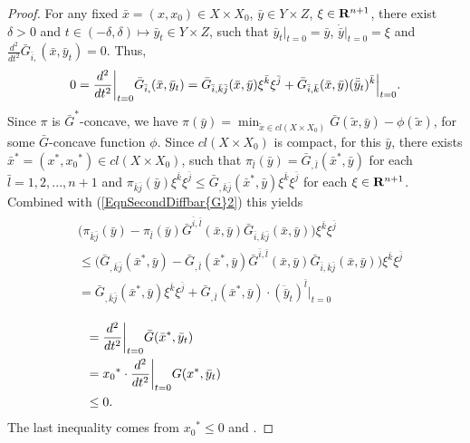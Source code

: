 \begin{proof}
		For any fixed $\bar{x} = (x, x_0) \in X \times X_0$, $\bar{y} \in Y\times Z$, $\xi \in {\mathbf R}^{n+1}$, there exist $\delta >0$ and $t \in (-\delta, \delta) \longmapsto \bar{y}_t \in Y\times Z$, such that $\bar{y}_t|_{t=0} =\bar{y}$,  $\dot{\bar{y}}|_{t=0} = \xi$ and $\frac{d^2}{dt^2} \bar{G}_{\bar{i}, }(\bar{x}, \bar{y}_t) = 0$. Thus, 
		\begin{equation}\label{EqnSecondDiffbar{G}2}
		0 = \frac{d^2}{dt^2}\bigg|_{t=0}\bar{G}_{\bar{i},}(\bar{x}, \bar{y}_t) = \bar{G}_{\bar{i}, \bar{k}\bar{j}}(\bar{x}, \bar{y}) \xi^{\bar{k}}\xi^{\bar{j}} + \bar{G}_{\bar{i}, \bar{k}}(\bar{x}, \bar{y}) (\ddot{\bar{y}}_t)^{\bar{k}}\Big|_{t=0}.
		\end{equation}
		Since $\pi$ is $\bar{G}^*$-concave, we have $\pi(\bar{y}) =\min_{\tilde{x} \in cl(X \times X_0)} \bar{G}(\tilde{x}, \bar{y}) - \phi(\tilde{x})$, for some $\bar{G}$-concave function $\phi$. Since $cl(X \times X_0)$ is compact, for this $\bar{y}$, there exists ${\bar{x}}^* = ({x}^*, {x_0}^*) \in cl(X \times X_0)$, such that 
		$\pi_{\bar{l}}(\bar{y}) = \bar{G}_{,\bar{l}}({\bar{x}}^*, \bar{y})$ for each $\bar{l} = 1, 2,..., n+1$ and $\pi_{\bar{k}\bar{j}}(\bar{y})\xi^{\bar{k}}\xi^{\bar{j}} \le \bar{G}_{,\bar{k}\bar{j}}({\bar{x}^*}, \bar{y})\xi^{\bar{k}}\xi^{\bar{j}}$  for each $\xi \in {\mathbf R}^{n+1}$. 
		Combined with (\ref{EqnSecondDiffbar{G}2}) this yields
		\begin{align*}\label{Eqn:proofcor}
		\begin{split}
		&\big(\pi_{\bar{k}\bar{j}}(\bar{y})- \pi_{\bar{l}}(\bar{y}) \bar{G}^{\bar i,\bar l}(\bar{x}, \bar{y})\bar{G}_{\bar{i},\bar{k}\bar{j}}(\bar{x}, \bar{y})\big)\xi^{\bar{k}}\xi^{\bar{j}} \\
		&\le
		\big(\bar{G}_{,\bar{k}\bar{j}}({\bar{x}}^*, \bar{y})- \bar{G}_{,\bar{l}}({\bar{x}}^*, \bar{y})\bar{G}^{\bar i,\bar l}(\bar{x}, \bar{y})\bar{G}_{\bar{i},\bar{k}\bar{j}}(\bar{x}, \bar{y})\big)\xi^{\bar{k}}\xi^{\bar{j}} \\
		&= \bar{G}_{,\bar{k}\bar{j}}({\bar{x}}^*, \bar{y})\xi^{\bar{k}}\xi^{\bar{j}}+ \bar{G}_{,\bar{l}}({\bar{x}}^*, \bar{y})\cdot (\ddot{\bar{y}}_t)^{\bar{l}}\big|_{t=0}\\
		\end{split}
		\end{align*}
		\begin{align*}
		\begin{split}
		& = \frac{d^2}{dt^2}\bigg|_{t=0} \bar{G}({\bar{x}}^*, \bar{y}_t) \hspace{5.33cm}\\
		& = {x_0}^* \cdot\frac{d^2}{dt^2}\bigg|_{t=0} G({x}^*, \bar{y}_t) \\
		&\le 0.
		\end{split}
		\end{align*}
		The last inequality comes from ${x_0}^* \le 0$ and \Gthree.
	\end{proof}
	

